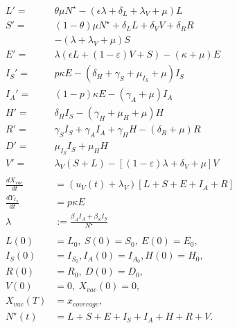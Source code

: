 \begin{equation}
    \label{eqn:vacination_dynamics}
    \begin{aligned}
        L' =&  \theta \mu N^{\star}
                -(\epsilon \lambda + \delta_L + \lambda_V +\mu) L
        \\
        S' =&
            (1 - \theta) \mu N^\star
            + \delta_L L
            + \delta_V V
            + \delta_R R
            \\
            &-
            \left(
                \lambda + \lambda_V + \mu
            \right) S
        \\
        E' =&
                \lambda (\epsilon L + (1-\varepsilon) V + S)
                - (\kappa + \mu) E
        \\
        I_S' =&
            p \kappa E
            -
            (
                \delta_H +
                \gamma_S +
                \mu_{I_S} +
                \mu
            ) I_S
        \\
        I_A' = &
                (1 - p) \kappa E - (\gamma_A + \mu) I_A
        \\
        H' = &
            \delta_H I_S - (\gamma_H + \mu_H + \mu) H
        \\
        R' = &
            \gamma_S I_S +
            \gamma_A I_A +
            \gamma_H H
                - (\delta_R + \mu) R
        \\
        D'  = &
                \mu_{I_S} I_S + \mu_H H
        \\
        V' = &
            \lambda_V  (S + L)
            - \left[
                (1 - \varepsilon) \lambda
                + \delta_V
                + \mu
            \right ] V
        \\
        \\
            \frac{dX_{vac}}{dt}
                &=
                (u_V(t) + \lambda_V)
                \left[
                    L + S + E + I_A + R
                \right]
        \\
            \frac{d Y_{I_S}}{dt}
                & = p \kappa E
        \\
            \lambda &:=
                \frac{\beta_A I_A + \beta_S I_S}{N^{\star}}
        \\
        \\
            L(0) &= L_0,
            \ S(0) = S_0,
            \ E(0) = E_0,
        \\
            I_S(0) &= I_{S_{0}},
            I_A(0) = I_{A_{0}},
            H(0) = H_0,
        \\
            R(0) &= R_0, \ D(0) = D_0,
      \\
            V(0) &= 0, \ X_{vac}(0) = 0, \quad
      \\
            X_{vac}(T) &= x_{coverage},
      \\
            N^{\star}(t) &=
                L + S +E + I_S + I_A +
                H + R + V .
        \end{aligned}
\end{equation}
